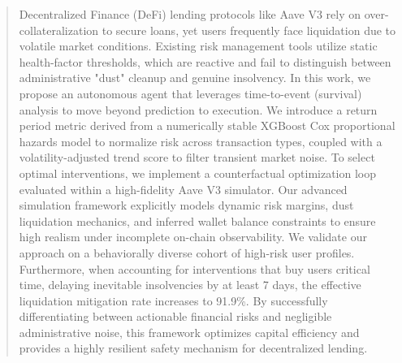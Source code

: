 \documentclass[manuscript,screen,review]{acmart}
\begin{document}
\begin{abstract}
Decentralized Finance (DeFi) lending protocols like Aave V3 rely on over-collateralization to secure loans, yet users frequently face liquidation due to volatile market conditions. Existing risk management tools utilize static health-factor thresholds, which are reactive and fail to distinguish between administrative "dust" cleanup and genuine insolvency. In this work, we propose an autonomous agent that leverages time-to-event (survival) analysis to move beyond prediction to execution.  We introduce a return period metric derived from a numerically stable XGBoost Cox proportional hazards model to normalize risk across transaction types, coupled with a volatility-adjusted trend score to filter transient market noise. To select optimal interventions, we implement a counterfactual optimization loop evaluated within a high-fidelity Aave V3 simulator. Our advanced simulation framework explicitly models dynamic risk margins, dust liquidation mechanics, and inferred wallet balance constraints to ensure high realism under incomplete on-chain observability. We validate our approach on a behaviorally diverse cohort of high-risk user profiles.  Furthermore, when accounting for interventions that buy users critical time, delaying inevitable insolvencies by at least 7 days, the effective liquidation mitigation rate increases to 91.9\%. By successfully differentiating between actionable financial risks and negligible administrative noise, this framework optimizes capital efficiency and provides a highly resilient safety mechanism for decentralized lending.
\end{abstract}
\end{document}
